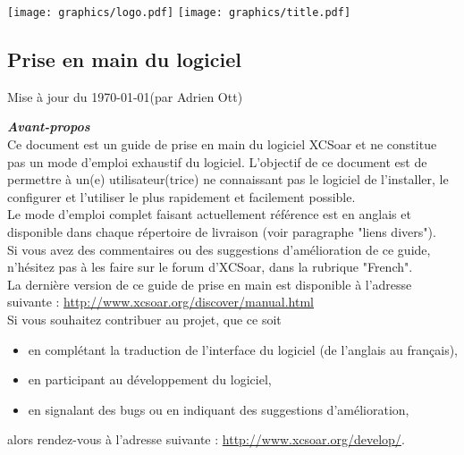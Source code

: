 \documentclass{article}
\begin{document}
%
\begin{center}
\texttt{[image: graphics/logo.pdf]}
\vskip 0.5cm
\texttt{[image: graphics/title.pdf]}
\subsection*{Prise en main du logiciel}
\end{center}
%
\begin{flushright}
Mise à jour du \today \space(par Adrien Ott)
\end{flushright}
%
\pagebreak
\noindent
\textbf{\textit{Avant-propos}}\\
\newline
Ce document est un guide de prise en main du logiciel XCSoar et ne constitue pas un mode d'emploi exhaustif du logiciel. L'objectif de ce document est de permettre à un(e) utilisateur(trice) ne connaissant pas le logiciel de l'installer, le configurer et l'utiliser le plus rapidement et facilement possible.\\Le mode d'emploi complet faisant actuellement référence est en anglais et disponible dans chaque répertoire de livraison (voir paragraphe "liens divers").\\Si vous avez des commentaires ou des suggestions d'amélioration de ce guide, n'hésitez pas à les faire sur le forum d'XCSoar, dans la rubrique "French".\\
\newline
La dernière version de ce guide de prise en main est disponible à l'adresse suivante : \url{http://www.xcsoar.org/discover/manual.html}\\
\newline
Si vous souhaitez contribuer au projet, que ce soit
\begin{itemize}
\item en complétant la traduction de l'interface du logiciel (de l'anglais au français),
\item en participant au développement du logiciel,
\item en signalant des bugs ou en indiquant des suggestions d'amélioration,
\end{itemize}
alors rendez-vous à l'adresse suivante : \url{http://www.xcsoar.org/develop/}.\\
%
\end{document}
